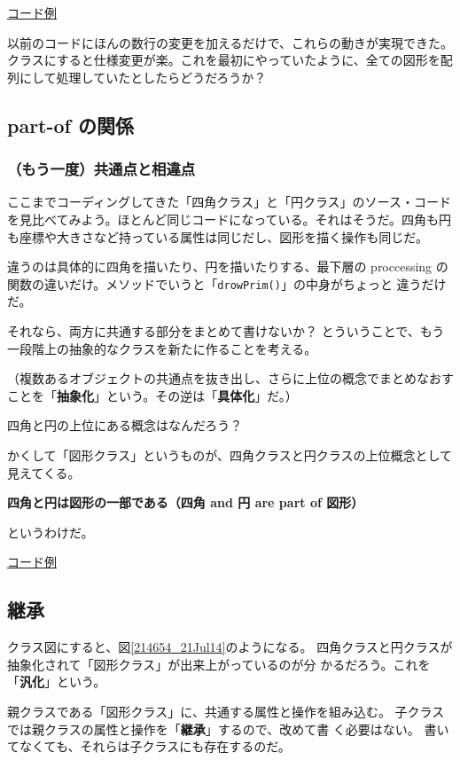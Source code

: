\documentclass[uplatex,a4j,11pt]{jsarticle}
\begin{document}
\href{prim_class02.txt}{コード例}

以前のコードにほんの数行の変更を加えるだけで、これらの動きが実現できた。
クラスにすると仕様変更が楽。これを最初にやっていたように、全ての図形を配
列にして処理していたとしたらどうだろうか？


\subsection{part-of の関係}

\subsubsection{（もう一度）共通点と相違点}

ここまでコーディングしてきた「四角クラス」と「円クラス」のソース・コード
を見比べてみよう。ほとんど同じコードになっている。それはそうだ。四角も円
も座標や大きさなど持っている属性は同じだし、図形を描く操作も同じだ。

違うのは具体的に四角を描いたり、円を描いたりする、最下層の proccessing
の関数の違いだけ。メソッドでいうと「\verb|drowPrim()|」の中身がちょっと
違うだけだ。

それなら、両方に共通する部分をまとめて書けないか？
とういうことで、もう一段階上の抽象的なクラスを新たに作ることを考える。

（複数あるオブジェクトの共通点を抜き出し、さらに上位の概念でまとめなおす
ことを「{\bfseries 抽象化}」という。その逆は「{\bfseries 具体化}」だ。）

四角と円の上位にある概念はなんだろう？

かくして「図形クラス」というものが、四角クラスと円クラスの上位概念として
見えてくる。

\begin{center}
 {\bfseries 四角と円は図形の一部である（四角 and 円 are part of 図形）}
\end{center}

というわけだ。

\href{prim_class20.txt}{コード例}

\subsection{継承}

クラス図にすると、図\ref{214654_21Jul14}のようになる。
四角クラスと円クラスが抽象化されて「図形クラス」が出来上がっているのが分
かるだろう。これを「{\bfseries 汎化}」という。

親クラスである「図形クラス」に、共通する属性と操作を組み込む。
子クラスでは親クラスの属性と操作を「{\bfseries 継承}」するので、改めて書
く必要はない。
書いてなくても、それらは子クラスにも存在するのだ。
\end{document}
